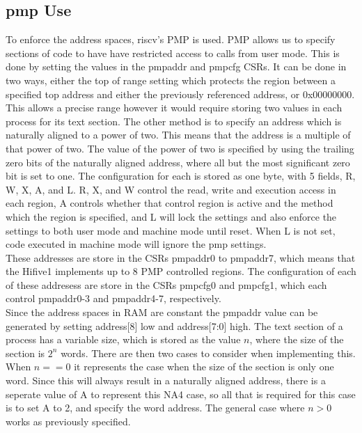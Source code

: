 \subsection{\ac{pmp} Use}
To enforce the address spaces, \gls{riscv}'s PMP is used. PMP allows us to specify sections of code to have have restricted access to calls from user mode. This is done by setting the values in the pmpaddr and pmpcfg CSRs. It can be done in two ways, either the top of range setting which protects the region between a specified top address and either the previously referenced address, or 0x00000000. This allows a precise range however it would require storing two values in each process for its text section. The other method is to specify an address which is naturally aligned to a power of two. This means that the address is a multiple of that power of two. The value of the power of two is specified by using the trailing zero bits of the naturally aligned address, where all but the most significant zero bit is set to one. The configuration for each is stored as one byte, with 5 fields, R, W, X, A, and L. R, X, and W control the read, write and execution access in each region, A controls whether that control region is active and the method which the region is specified, and L will lock the settings and also enforce the settings to both user mode and machine mode until reset. When L is not set, code executed in machine mode will ignore the \ac{pmp} settings.\\
These addresses are store in the CSRs pmpaddr0 to pmpaddr7, which means that the Hifive1 implements up to 8 PMP controlled regions. The configuration of each of these addresess are store in the CSRs pmpcfg0 and pmpcfg1, which each control pmpaddr0-3 and pmpaddr4-7, respectively.\\
Since the address spaces in RAM are constant the pmpaddr value can be generated by setting address[8] low and address[7:0] high. The text section of a process has a variable size, which is stored as the value \(n\), where the size of the section is \(2^n\) words. There are then two cases to consider when implementing this. When \(n == 0\) it represents the case when the size of the section is only one word. Since this will always result in a naturally aligned address, there is a seperate value of A to represent this NA4 case, so all that is required for this case is to set A to 2, and specify the word address. The general case where \(n > 0\) works as previously specified. 
